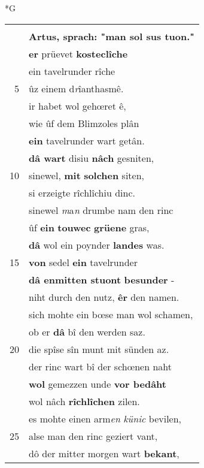 \documentclass[8pt,a4paper,notitlepage]{article}
\begin{document}
\newpage
\begin{table}[ht]
\begin{minipage}[t]{0.5\linewidth}
\small
\begin{center}*G
\end{center}
\begin{tabular}{rl}
 & \textbf{\begin{large}U\end{large}tpandraguns sun,}\\ 
 & \textbf{Artus, sprach: "man sol sus tuon."}\\ 
 & \textbf{er} prüevet \textbf{kosteclîche}\\ 
 & ein tavelrunder rîche\\ 
5 & ûz einem d\textit{r}îanthasmê.\\ 
 & ir habet wol gehœret ê,\\ 
 & wie ûf dem Blimzoles plân\\ 
 & \textbf{ein} tavelrunder wart getân.\\ 
 & \textbf{dâ wart} disiu \textbf{nâch} gesniten,\\ 
10 & sinewel, \textbf{mit} \textbf{solchen} siten,\\ 
 & si erzeigte rîchlîchiu dinc.\\ 
 & sinewel \textit{m}a\textit{n} drumbe nam den rinc\\ 
 & ûf \textbf{ein} \textbf{touwec} \textbf{grüene} gras,\\ 
 & \textbf{dâ} wol ein poynder \textbf{landes} was.\\ 
15 & \textbf{von} sedel \textbf{ein} tavelrunder\\ 
 & \textbf{dâ enmitten stuont} \textbf{besunder} -\\ 
 & niht durch den nutz, \textbf{êr} den namen.\\ 
 & sich mohte ein bœse man wol schamen,\\ 
 & ob er \textbf{dâ} bî den werden saz.\\ 
20 & die spîse sîn munt mit sünden az.\\ 
 & der rinc wart bî der schœnen naht\\ 
 & \textbf{wol} gemezzen unde \textbf{vor bedâht}\\ 
 & wol nâch \textbf{rîchlîchen} zilen.\\ 
 & es mohte einen arm\textit{en} \textit{künic} bevilen,\\ 
25 & alse man den rinc geziert vant,\\ 
 & dô der mitter morgen wart \textbf{bekant},\\ 

\end{tabular}
\end{minipage}
\end{table}
\end{document}
